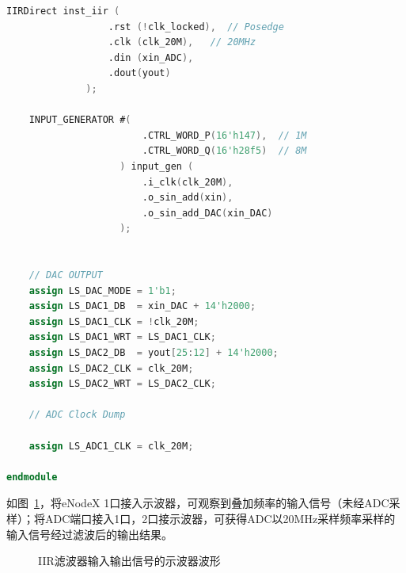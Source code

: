 \begin{lstlisting}[language=verilog,caption={顶层模块代码},label=lst:top_module]
    IIRDirect inst_iir (
                  .rst (!clk_locked),  // Posedge
                  .clk (clk_20M),   // 20MHz
                  .din (xin_ADC),
                  .dout(yout)
              );
    
    INPUT_GENERATOR #(
                        .CTRL_WORD_P(16'h147),  // 1M
                        .CTRL_WORD_Q(16'h28f5)  // 8M
                    ) input_gen (
                        .i_clk(clk_20M),
                        .o_sin_add(xin),
                        .o_sin_add_DAC(xin_DAC)
                    );
    
    
    // DAC OUTPUT
    assign LS_DAC_MODE = 1'b1;
    assign LS_DAC1_DB  = xin_DAC + 14'h2000;
    assign LS_DAC1_CLK = !clk_20M;
    assign LS_DAC1_WRT = LS_DAC1_CLK;
    assign LS_DAC2_DB  = yout[25:12] + 14'h2000;
    assign LS_DAC2_CLK = clk_20M;
    assign LS_DAC2_WRT = LS_DAC2_CLK;
    
    // ADC Clock Dump
    
    assign LS_ADC1_CLK = clk_20M;
    
endmodule
\end{lstlisting}    

如图~\ref{fig:exp8:waveform}，将eNodeX 1口接入示波器，可观察到叠加频率的输入信号（未经ADC采样）；将ADC端口接入1口，2口接示波器，可获得ADC以20MHz采样频率采样的输入信号经过滤波后的输出结果。
\begin{figure}[htbp]
  \centering
    \hspace{0.05\textwidth}
  \caption{IIR滤波器输入输出信号的示波器波形}
  \label{fig:exp8:waveform}
\end{figure}


